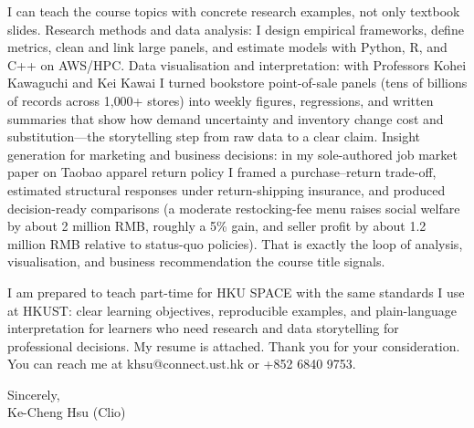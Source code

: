 \documentclass[11pt,letterpaper]{article}
\begin{document}
I can teach the course topics with concrete research examples, not only textbook slides. Research methods and data analysis: I design empirical frameworks, define metrics, clean and link large panels, and estimate models with Python, R, and C++ on AWS/HPC. Data visualisation and interpretation: with Professors Kohei Kawaguchi and Kei Kawai I turned bookstore point-of-sale panels (tens of billions of records across 1{,}000+ stores) into weekly figures, regressions, and written summaries that show how demand uncertainty and inventory change cost and substitution---the storytelling step from raw data to a clear claim. Insight generation for marketing and business decisions: in my sole-authored job market paper on Taobao apparel return policy I framed a purchase--return trade-off, estimated structural responses under return-shipping insurance, and produced decision-ready comparisons (a moderate restocking-fee menu raises social welfare by about 2 million RMB, roughly a 5\% gain, and seller profit by about 1.2 million RMB relative to status-quo policies). That is exactly the loop of analysis, visualisation, and business recommendation the course title signals.

I am prepared to teach part-time for HKU SPACE with the same standards I use at HKUST: clear learning objectives, reproducible examples, and plain-language interpretation for learners who need research and data storytelling for professional decisions. My resume is attached. Thank you for your consideration. You can reach me at khsu@connect.ust.hk or +852 6840 9753.

\vspace{0.3em}
Sincerely,\\[0.25em]
Ke-Cheng Hsu (Clio)
\end{document}
